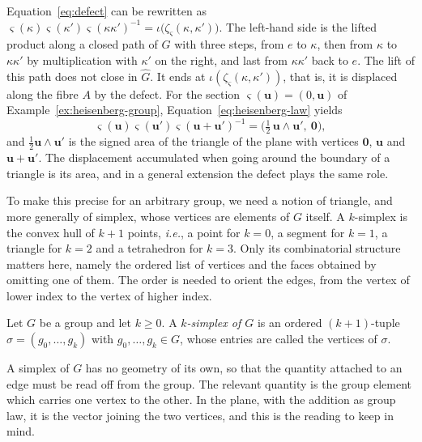 \begin{remark}\label{rem:holonomy}
	Equation~\eqref{eq:defect} can be rewritten as $\varsigma(\kappa)\varsigma(\kappa')\varsigma(\kappa\kappa')^{-1}=\iota\big(\zeta_\varsigma(\kappa,\kappa')\big)$. The left-hand side is the lifted product along a closed path of $G$ with three steps, from $e$ to $\kappa$, then from $\kappa$ to $\kappa\kappa'$ by multiplication with $\kappa'$ on the right, and last from $\kappa\kappa'$ back to $e$. The lift of this path does not close in $\widehat{G}$. It ends at $\iota(\zeta_\varsigma(\kappa,\kappa'))$, that is, it is displaced along the fibre $A$ by the defect. For the section $\varsigma(\mathbf{u})=(0,\mathbf{u})$ of Example~\ref{ex:heisenberg-group}, Equation~\eqref{eq:heisenberg-law} yields
	\begin{equation*}
		\varsigma(\mathbf{u})\varsigma(\mathbf{u}')\varsigma(\mathbf{u}+\mathbf{u}')^{-1}=\big(\tfrac12\,\mathbf{u}\wedge\mathbf{u}',\ \mathbf{0}\big),
	\end{equation*}
	and $\tfrac12\mathbf{u}\wedge\mathbf{u}'$ is the signed area of the triangle of the plane with vertices $\mathbf{0}$, $\mathbf{u}$ and $\mathbf{u}+\mathbf{u}'$. The displacement accumulated when going around the boundary of a triangle is its area, and in a general extension the defect plays the same role.
\end{remark}

To make this precise for an arbitrary group, we need a notion of triangle, and more generally of simplex, whose vertices are elements of $G$ itself. A $k$-simplex is the convex hull of $k+1$ points, \textit{i.e.}, a point for $k=0$, a segment for $k=1$, a triangle for $k=2$ and a tetrahedron for $k=3$. Only its combinatorial structure matters here, namely the ordered list of vertices and the faces obtained by omitting one of them. The order is needed to orient the edges, from the vertex of lower index to the vertex of higher index.

\begin{definition}\label{def:simplex}
	Let $G$ be a group and let $k\geq0$. A \emph{$k$-simplex of $G$} is an ordered $(k+1)$-tuple $\sigma=(g_0,\dots,g_k)$ with $g_0,\dots,g_k\in G$, whose entries are called the vertices of $\sigma$.
\end{definition}

A simplex of $G$ has no geometry of its own, so that the quantity attached to an edge must be read off from the group. The relevant quantity is the group element which carries one vertex to the other. In the plane, with the addition as group law, it is the vector joining the two vertices, and this is the reading to keep in mind.

